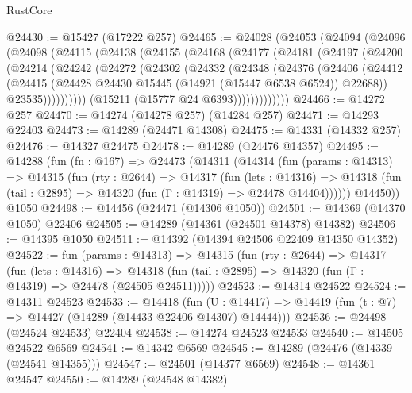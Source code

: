 \begin{lexlean}{RustCore}
\begin{coremodule}
@24430 := @15427 (@17222 @257)
@24465 := @24028
    (@24053
      (@24094
        (@24096
          (@24098
            (@24115
              (@24138
                (@24155
                  (@24168
                    (@24177
                      (@24181
                        (@24197
                          (@24200
                            (@24214
                              (@24242
                                (@24272
                                  (@24302
                                    (@24332
                                      (@24348
                                        (@24376
                                          (@24406
                                            (@24412
                                              (@24415
                                                (@24428
                                                  @24430
                                                  @15445
                                                  (@14921 (@15447 @6538 @6524))
                                                  @22688))
                                              @23535))))))))))
                          (@15211 (@15777 @24 @6393)))))))))))))
@24466 := @14272 @257
@24470 := @14274 (@14278 @257) (@14284 @257)
@24471 := @14293 @22403
@24473 := @14289 (@24471 @14308)
@24475 := @14331 (@14332 @257)
@24476 := @14327 @24475
@24478 := @14289 (@24476 @14357)
@24495 := @14288
    (fun (fn : @167) =>
    @24473
      (@14311
        (@14314
          (fun (params : @14313) =>
          @14315
            (fun (rty : @2644) =>
            @14317
              (fun (lets : @14316) =>
              @14318 (fun (tail : @2895) => @14320 (fun (Γ : @14319) => @24478 @14404))))))
        @14450))
    @1050
@24498 := @14456 (@24471 (@14306 @1050))
@24501 := @14369 (@14370 @1050) @22406
@24505 := @14289 (@14361 (@24501 @14378) @14382)
@24506 := @14395 @1050
@24511 := @14392 (@14394 @24506 @22409 @14350 @14352)
@24522 := fun (params : @14313) =>
  @14315
    (fun (rty : @2644) =>
    @14317
      (fun (lets : @14316) =>
      @14318 (fun (tail : @2895) => @14320 (fun (Γ : @14319) => @24478 (@24505 @24511)))))
@24523 := @14314 @24522
@24524 := @14311 @24523
@24533 := @14418
    (fun (U : @14417) => @14419 (fun (t : @7) => @14427 (@14289 (@14433 @22406 @14307) @14444)))
@24536 := @24498 (@24524 @24533) @22404
@24538 := @14274 @24523 @24533
@24540 := @14505 @24522 @6569
@24541 := @14342 @6569
@24545 := @14289 (@24476 (@14339 (@24541 @14355)))
@24547 := @24501 (@14377 @6569)
@24548 := @14361 @24547
@24550 := @14289 (@24548 @14382)

\end{coremodule}
\end{lexlean}
